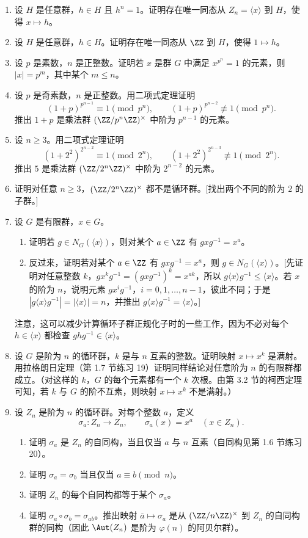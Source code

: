 \begin{enumerate}[label=\arabic*.]
  \item 设 $H$ 是任意群，$h\in H$ 且 $h^n=1$。证明存在唯一同态从 $Z_n=\langle x\rangle$ 到 $H$，使得 $x\mapsto h$。
  \item 设 $H$ 是任意群，$h\in H$。证明存在唯一同态从 $\ZZ$ 到 $H$，使得 $1\mapsto h$。
  \item 设 $p$ 是素数，$n$ 是正整数。证明若 $x$ 是群 $G$ 中满足 $x^{p^n}=1$ 的元素，则 $|x|=p^m$，其中某个 $m\leq n$。
  \item 设 $p$ 是奇素数，$n$ 是正整数。用二项式定理证明
  \[
    (1+p)^{p^{n-1}}\equiv 1\pmod{p^n},
    \qquad
    (1+p)^{p^{n-2}}\not\equiv 1\pmod{p^n}.
  \]
  推出 $1+p$ 是乘法群 $(\ZZ/p^n\ZZ)^\times$ 中阶为 $p^{n-1}$ 的元素。
  \item 设 $n\geq3$。用二项式定理证明
  \[
    (1+2^2)^{2^{n-2}}\equiv1\pmod{2^n},
    \qquad
    (1+2^2)^{2^{n-3}}\not\equiv1\pmod{2^n}.
  \]
  推出 $5$ 是乘法群 $(\ZZ/2^n\ZZ)^\times$ 中阶为 $2^{n-2}$ 的元素。
  \item 证明对任意 $n\geq3$，$(\ZZ/2^n\ZZ)^\times$ 都不是循环群。[找出两个不同的阶为 $2$ 的子群。]
  \item 设 $G$ 是有限群，$x\in G$。
  \begin{enumerate}[label=(\alph*)]
    \item 证明若 $g\in N_G(\langle x\rangle)$，则对某个 $a\in\ZZ$ 有 $gxg^{-1}=x^a$。
    \item 反过来，证明若对某个 $a\in\ZZ$ 有 $gxg^{-1}=x^a$，则 $g\in N_G(\langle x\rangle)$。[先证明对任意整数 $k$，$gx^kg^{-1}=(gxg^{-1})^k=x^{ak}$，所以 $g\langle x\rangle g^{-1}\leq\langle x\rangle$。若 $x$ 的阶为 $n$，说明元素 $gx^ig^{-1}$，$i=0,1,\ldots,n-1$，彼此不同；于是 $|g\langle x\rangle g^{-1}|=|\langle x\rangle|=n$，并推出 $g\langle x\rangle g^{-1}=\langle x\rangle$。]
  \end{enumerate}
  注意，这可以减少计算循环子群正规化子时的一些工作，因为不必对每个 $h\in\langle x\rangle$ 都检查 $ghg^{-1}\in\langle x\rangle$。
  \item 设 $G$ 是阶为 $n$ 的循环群，$k$ 是与 $n$ 互素的整数。证明映射 $x\mapsto x^k$ 是满射。用拉格朗日定理（第 1.7 节练习 19）证明同样结论对任意阶为 $n$ 的有限群都成立。（对这样的 $k$，$G$ 的每个元素都有一个 $k$ 次根。由第 3.2 节的柯西定理可知，若 $k$ 与 $G$ 的阶不互素，则映射 $x\mapsto x^k$ 不是满射。）
  \item 设 $Z_n$ 是阶为 $n$ 的循环群。对每个整数 $a$，定义
  \[
    \sigma_a:Z_n\to Z_n,
    \qquad
    \sigma_a(x)=x^a\quad (x\in Z_n).
  \]
  \begin{enumerate}[label=(\alph*)]
    \item 证明 $\sigma_a$ 是 $Z_n$ 的自同构，当且仅当 $a$ 与 $n$ 互素（自同构见第 1.6 节练习 20）。
    \item 证明 $\sigma_a=\sigma_b$ 当且仅当 $a\equiv b\pmod n$。
    \item 证明 $Z_n$ 的每个自同构都等于某个 $\sigma_a$。
    \item 证明 $\sigma_a\circ\sigma_b=\sigma_{ab}$。推出映射 $\overline{a}\mapsto \sigma_a$ 是从 $(\ZZ/n\ZZ)^\times$ 到 $Z_n$ 的自同构群的同构（因此 $\Aut(Z_n)$ 是阶为 $\varphi(n)$ 的阿贝尔群）。
  \end{enumerate}
\end{enumerate}

